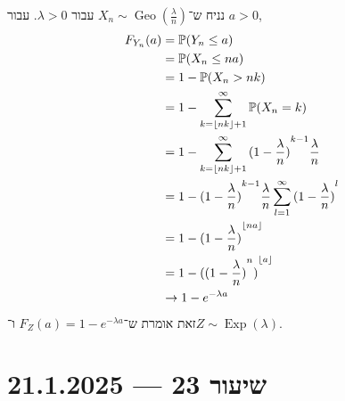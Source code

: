 \begin{example}
	נניח ש־$X_n \sim \operatorname{Geo}(\frac{\lambda}{n})$ עבור $\lambda > 0$.
	עבור $a > 0$,
	\begin{align*}
		F_{Y_n}(a)
		& = \mathbb{P}(Y_n \le a) \\
		& = \mathbb{P}(X_n \le na) \\
		& = 1 - \mathbb{P}(X_n > nk) \\
		& = 1 - \sum_{k = \lfloor nk \rfloor + 1}^{\infty} \mathbb{P}(X_n = k) \\
		& = 1 - \sum_{k = \lfloor nk \rfloor + 1}^{\infty} {(1 - \frac{\lambda}{n})}^{k - 1} \frac{\lambda}{n} \\
		& = 1 - {(1 - \frac{\lambda}{n})}^{k - 1} \frac{\lambda}{n} \sum_{l = 1}^{\infty} {(1 - \frac{\lambda}{n})}^l \\
		& = 1 - {(1 - \frac{\lambda}{n})}^{\lfloor na \rfloor} \\
		& = 1 - {({(1 - \frac{\lambda}{n})}^n)}^{\lfloor a \rfloor} \\
		& \to 1 - e^{-\lambda a}
	\end{align*}
	זאת אומרת ש־$F_Z(a) = 1 - e^{-\lambda a}$ ו־$Z \sim \operatorname{Exp}(\lambda)$.
\end{example}

\section{שיעור 23 --- 21.1.2025}
